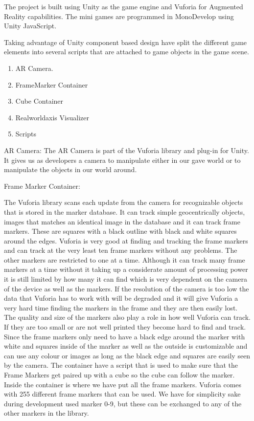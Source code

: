 The project is built using Unity as the game engine and Vuforia for Augmented Reality capabilities. The mini games are programmed in MonoDevelop using Unity JavaScript.


Taking advantage of Unity component based design have split the different game elements into several scripts that are attached to game objects in the game scene.

\begin{enumerate}
	\item AR Camera.
	\item FrameMarker Container
	\item Cube Container
	\item Realworldaxis Visualizer
	\item Scripts
\end{enumerate}

AR Camera:
The AR Camera is part of the Vuforia library and plug-in for Unity. It gives us as developers a camera to manipulate either in our gave world or to manipulate the objects in our world around.

Frame Marker Container:

The Vuforia library scans each update from the camera for recognizable objects that is stored in the marker database. It can track simple geocentrically objects, images that matches an identical image in the database and it can track frame markers. These are squares with a black outline with black and white squares around the edges. Vuforia is very good at finding and tracking the frame markers and can track at the very least ten frame markers without any problems. The other markers are restricted to one at a time.
Although it can track many frame markers at a time without it taking up a considerate amount of processing power it is still limited by how many it can find which is very dependent on the camera of the device as well as the markers. If the resolution of the camera is too low the data that Vuforia has to work with will be degraded and it will give Vuforia a very hard time finding the markers in the frame and they are then easily lost. The quality and size of the markers also play a role in how well Vuforia can track. If they are too small or are not well printed they become hard to find and track. Since the frame markers only need to have a black edge around the marker with white and squares inside of the marker as well as the outside is customizable and can use any colour or images as long as the black edge and squares are easily seen by the camera.
The container have a script that is used to make sure that the Frame Markers get paired up with a cube so the cube can follow the marker.
Inside the container is where we have put all the frame markers. Vuforia comes with 255 different frame markers that can be used. We have for simplicity sake during development used marker 0-9, but these can be exchanged to any of the other markers in the library.

